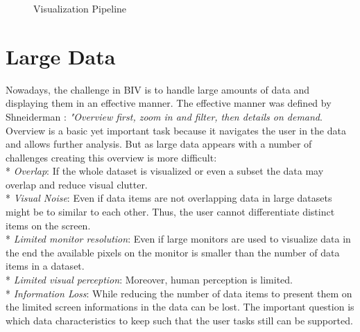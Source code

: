 \begin{figure}[H]
    \centering
    \caption{Visualization Pipeline \cite{Ware2012a}}
    \label{fig:my_label}
\end{figure}

\section{Large Data}
Nowadays, the challenge in BIV is to handle large amounts of data and displaying them in an effective manner. The effective manner was defined by Shneiderman \cite{paterno1997concurtasktrees, Shneiderman2008, Keim2008}: \textit{"Overview first, zoom in and filter, then details on demand}. Overview is a basic yet important task because it navigates the user in the data and allows further analysis. But as large data appears with a number of challenges creating this overview is more difficult:
\\*
\textit{Overlap}: 
If the whole dataset is visualized or even a subset the data may overlap and reduce visual clutter.
\\*
\textit{Visual Noise}: 
Even if data items are not overlapping data in large datasets might be to similar to each other. Thus, the user cannot differentiate distinct items on the screen.
\\*
\textit{Limited monitor resolution}:
Even if large monitors are used to visualize data in the end the available pixels on the monitor is smaller than the number of data items in a dataset. 
\\*
\textit{Limited visual perception}:
Moreover, human perception is limited.
\\*
\textit{Information Loss}:
While reducing the number of data items to present them on the limited screen informations in the data can be lost. The important question is which data characteristics to keep such that the user tasks still can be supported.

